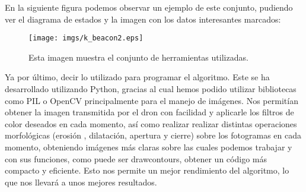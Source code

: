 En la siguiente figura podemos observar un ejemplo de este conjunto, pudiendo ver el diagrama de estados y la imagen con los datos interesantes marcados:

\begin{figure}[ht]
	\centering
		\texttt{[image: imgs/k\_beacon2.eps]}
		\caption{Esta imagen muestra el conjunto de herramientas utilizadas.}
	\label{fig:Herramientas}
\end{figure}


\hspace{1 cm} Ya por \'ultimo, decir lo utilizado para programar el algoritmo. Este se ha desarrollado utilizando Python, gracias al cual hemos podido utilizar bibliotecas como PIL o OpenCV principalmente para el manejo de im\'agenes. Nos permit\'ian obtener la imagen transmitida por el dron con facilidad y aplicarle los filtros de color deseados en cada momento, as\'i como realizar realizar distintas operaciones morfol\'ogicas (erosi\'on , dilataci\'on, apertura y cierre) sobre los fotogramas en cada momento, obteniendo im\'agenes m\'as claras sobre las cuales podemos trabajar y con sus funciones, como puede ser drawcontours, obtener un c\'odigo m\'as compacto y eficiente. Esto nos permite un mejor rendimiento del algoritmo, lo que nos llevar\'a a unos mejores resultados. 
